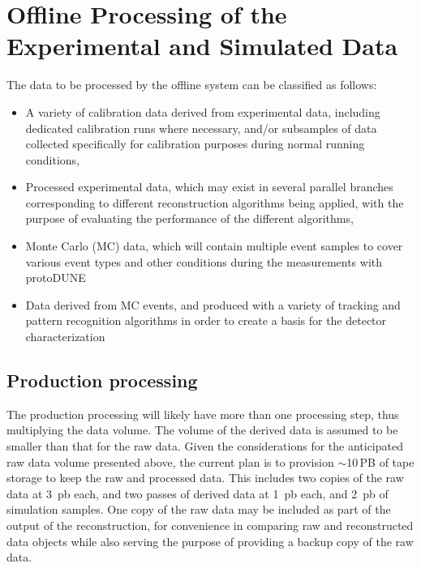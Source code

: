 \section{Offline Processing of the Experimental and Simulated Data}
\label{sec:protodune-offline}

The data to be processed by the offline system can be classified as follows:
\begin{itemize}

\item A variety of calibration data derived from experimental data, including dedicated calibration
runs where necessary, and/or subsamples of data collected specifically for calibration
purposes during normal running conditions,

\item Processed experimental data, which may exist in several parallel branches corresponding to
different reconstruction algorithms being applied, with the purpose of evaluating the performance
of the different algorithms,

\item Monte Carlo (MC) data, which will contain multiple event samples to cover various event types
and other conditions during the measurements with protoDUNE

\item Data derived from MC events, and produced with a variety of tracking and pattern recognition algorithms
in order to create a basis for the detector characterization

\end{itemize}

\subsection{Production processing}
\label{sec:prod-process}

The production processing will likely have more than one processing step,
thus multiplying the data volume.  The volume of the derived data is assumed to be smaller than that for the raw data.
Given the considerations for the anticipated raw data volume presented above,
the current plan is to provision $\sim$10\,PB of tape storage to keep the raw and processed data. This includes
two copies of the raw data at 3~pb each, and two passes of derived data at 1~pb each, and 2~pb of simulation samples.
One copy of the raw data may be included as part of the output of the reconstruction, for convenience in comparing
raw and reconstructed data objects while also serving the purpose of providing a backup copy of the raw data.

